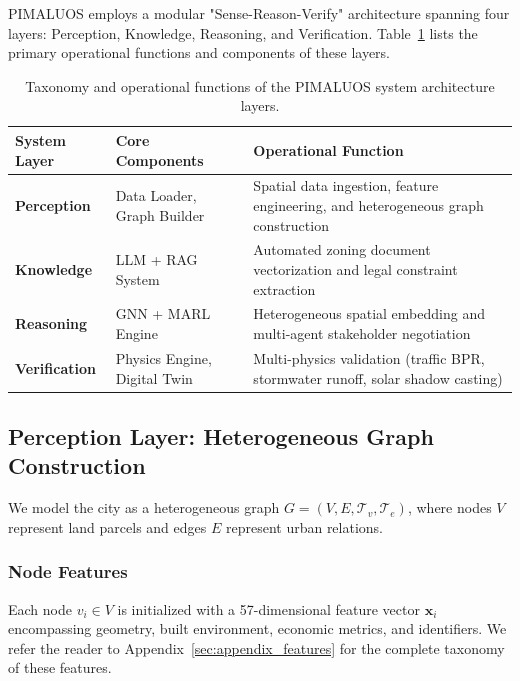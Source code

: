 \documentclass[final,3p,times]{elsarticle}
\begin{document}
PIMALUOS employs a modular "Sense-Reason-Verify" architecture spanning four layers: Perception, Knowledge, Reasoning, and Verification. Table~\ref{tab:system_layers} lists the primary operational functions and components of these layers.

\begin{table}[htbp]
\centering
\caption{Taxonomy and operational functions of the PIMALUOS system architecture layers.}
\label{tab:system_layers}
\begin{tabular}{llp{8.5cm}}
\toprule
\textbf{System Layer} & \textbf{Core Components} & \textbf{Operational Function} \\
\midrule
\textbf{Perception} & Data Loader, Graph Builder & Spatial data ingestion, feature engineering, and heterogeneous graph construction \\
\textbf{Knowledge} & LLM + RAG System & Automated zoning document vectorization and legal constraint extraction \\
\textbf{Reasoning} & GNN + MARL Engine & Heterogeneous spatial embedding and multi-agent stakeholder negotiation \\
\textbf{Verification} & Physics Engine, Digital Twin & Multi-physics validation (traffic BPR, stormwater runoff, solar shadow casting) \\
\bottomrule
\end{tabular}
\end{table}

\subsection{Perception Layer: Heterogeneous Graph Construction}
We model the city as a heterogeneous graph $G = (V, E, \mathcal{T}_v, \mathcal{T}_e)$, where nodes $V$ represent land parcels and edges $E$ represent urban relations.

\subsubsection{Node Features}
Each node $v_i \in V$ is initialized with a 57-dimensional feature vector $\mathbf{x}_i$ encompassing geometry, built environment, economic metrics, and identifiers. We refer the reader to Appendix~\ref{sec:appendix_features} for the complete taxonomy of these features.
\end{document}
